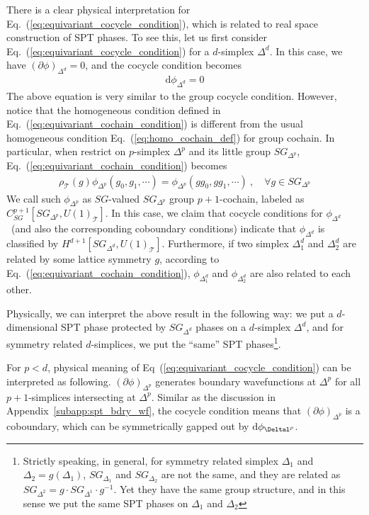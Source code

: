 \documentclass[%
 reprint,
 amsmath,amssymb,
 aps,pra,
]{revtex4-1}
\newcommand{\dd}{\mathrm{d}} %
\newcommand{\TT}{\mathcal{T}} %
\begin{document}
There is a clear physical interpretation for Eq.~(\ref{eq:equivariant_cocycle_condition}), which is related to real space construction of SPT phases.
To see this, let us first consider Eq.~(\ref{eq:equivariant_cocycle_condition}) for a $d$-simplex $\Delta^d$.
In this case, we have $(\partial\phi)_{\Delta^d}=0$, and the cocycle condition becomes
\begin{align}
    \dd\phi_{\Delta^d}=0
\end{align}
The above equation is very similar to the group cocycle condition. 
However, notice that the homogeneous condition defined in Eq.~(\ref{eq:equivariant_cochain_condition}) is different from the usual homogeneous condition Eq.~(\ref{eq:homo_cochain_def}) for group cochain.
In particular, when restrict on $p$-simplex $\Delta^p$ and its little group $SG_{\Delta^p}$, Eq.~(\ref{eq:equivariant_cochain_condition}) becomes
\begin{align}
  \rho_{\TT}(g)\phi_{\Delta^p}(g_0,g_1,\cdots)= \phi_{\Delta^p}(gg_0,gg_1,\cdots)~,\quad\forall g\in SG_{\Delta^p}
  \label{eq:SG-valued_SG_delta_cochain}
\end{align}
We call such $\phi_{\Delta^p}$ as $SG$-valued $SG_{\Delta^p}$ group $p+1$-cochain, labeled as $C_{SG}^{p+1}[SG_{\Delta^p},U(1)_\TT]$.
In this case, we claim that cocycle conditions for $\phi_{\Delta^d}$~(and also the corresponding coboundary conditions) indicate that $\phi_{\Delta^d}$ is classified by $H^{d+1}[SG_{\Delta^d},U(1)_\TT]$.
Furthermore, if two simplex $\Delta^d_1$ and $\Delta^d_2$ are related by some lattice symmetry $g$, according to Eq.~(\ref{eq:equivariant_cochain_condition}), $\phi_{\Delta_1^d}$ and $\phi_{\Delta_2^d}$ are also related to each other.

Physically, we can interpret the above result in the following way: we put a $d$-dimensional SPT phase protected by $SG_{\Delta^d}$ phases on a $d$-simplex $\Delta^d$, 
and for symmetry related $d$-simplices, we put the ``same'' SPT phases\footnote{Strictly speaking, in general, for symmetry related simplex $\Delta_1$ and $\Delta_2=g(\Delta_1)$, $SG_{\Delta_1}$ and $SG_{\Delta_2}$ are not the same, and they are related as $SG_{\Delta^2}=g\cdot SG_{\Delta^1}\cdot g^{-1}$.
Yet they have the same group structure, and in this sense we put the same SPT phases on $\Delta_1$ and $\Delta_2$}.

For $p<d$, physical meaning of Eq~(\ref{eq:equivariant_cocycle_condition}) can be interpreted as following.
$(\partial\phi)_{\Delta^p}$ generates boundary wavefunctions at $\Delta^p$ for all $p+1$-simplices intersecting at $\Delta^p$.
Similar as the discussion in Appendix~\ref{subapp:spt_bdry_wf}, the cocycle condition means that $(\partial\phi)_{\Delta^p}$ is a coboundary, which can be symmetrically gapped out by $\dd\phi_{\Deltal^p}$.
\end{document}
